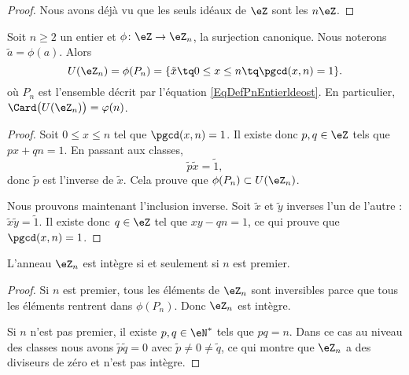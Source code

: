 \begin{proof}
    Nous avons déjà vu que les seuls idéaux de \( \eZ\) sont les \( n\eZ\).
\end{proof}

\begin{proposition}     \label{PropZpintssiprempUzn}
    Soit \( n\geq 2\) un entier et \( \phi\colon \eZ\to \eZ_n\), la surjection canonique. Nous noterons \( \tilde a=\phi(a)\). Alors
    \begin{equation}
        U(\eZ_n)=\phi(P_n)=\{ \tilde x\tq 0\leq x\leq n\tq\pgcd(x,n)=1 \}.
    \end{equation}
    où \( P_n\) est l'ensemble décrit par l'équation \eqref{EqDefPnEntierldeost}. En particulier, \( \Card\big( U(\eZ_n) \big)=\varphi(n)\).

\end{proposition}

\begin{proof}
    Soit \( 0\leq x\leq n\) tel que \( \pgcd(x,n)=1\). Il existe donc \( p,q\in\eZ\) tels que \( px+qn=1\). En passant aux classes,
    \begin{equation}
        \tilde p\tilde x=\tilde 1,
    \end{equation}
    donc \( \tilde p\) est l'inverse de \( \tilde x\). Cela prouve que \( \phi(P_n)\subset U(\eZ_n)\).

    Nous prouvons maintenant l'inclusion inverse. Soit \( \tilde x\) et \( \tilde y\) inverses l'un de l'autre : $\tilde x\tilde y=\tilde 1$. Il existe donc \( q\in\eZ\) tel que \( xy-qn=1\), ce qui prouve que \( \pgcd(x,n)=1\).

\end{proof}

\begin{corollary}   \label{CorZnInternprem}
    L'anneau \( \eZ_n\) est intègre si et seulement si \( n\) est premier.
\end{corollary}

\begin{proof}
    Si \( n\) est premier, tous les éléments de \( \eZ_n\) sont inversibles parce que tous les éléments rentrent dans \( \phi(P_n)\). Donc \( \eZ_n\) est intègre.

    Si \( n\) n'est pas premier, il existe \( p,q\in\eN^*\) tels que \( pq=n\). Dans ce cas au niveau des classes nous avons \( \tilde p\tilde q=0\) avec \( \tilde p\neq 0\neq\tilde q\), ce qui montre que \( \eZ_n\) a des diviseurs de zéro et n'est pas intègre.
\end{proof}

